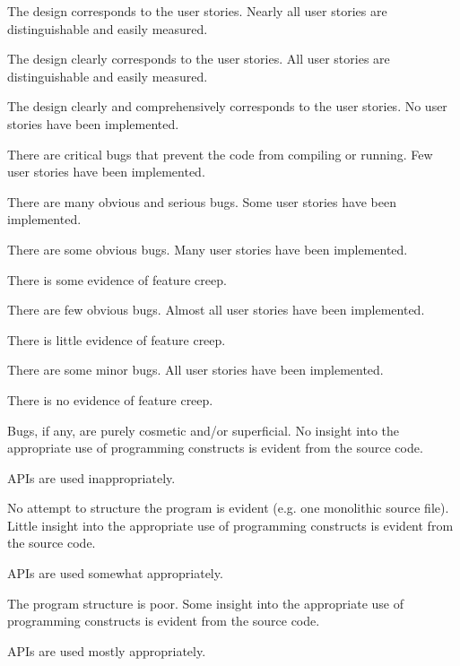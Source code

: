 \documentclass{../fal_assignment}
\begin{document}
\begin{markingrubric}
            \par The design corresponds to the user stories.
        \grade Nearly all user stories are distinguishable and easily measured.
            \par The design clearly corresponds to the user stories.
        \grade All user stories are distinguishable and easily measured.
            \par The design clearly and comprehensively corresponds to the user stories.
%
        \grade\fail No user stories have been implemented.
            \par There are critical bugs that prevent the code from compiling or running.
        \grade Few user stories have been implemented.
            \par There are many obvious and serious bugs.
        \grade Some user stories have been implemented.
            \par There are some obvious bugs.
        \grade Many user stories have been implemented.
            \par There is some evidence of feature creep.
            \par There are few obvious bugs.
        \grade Almost all user stories have been implemented.
            \par There is little evidence of feature creep.
            \par There are some minor bugs.
        \grade All user stories have been implemented.
            \par There is no evidence of feature creep.
            \par Bugs, if any, are purely cosmetic and/or superficial.
%
        \grade\fail No insight into the appropriate use of programming constructs is evident from the source code.
            \par APIs are used inappropriately.
            \par No attempt to structure the program is evident (e.g. one monolithic source file).
        \grade Little insight into the appropriate use of programming constructs is evident from the source code.
            \par APIs are used somewhat appropriately.
            \par The program structure is poor.
        \grade Some insight into the appropriate use of programming constructs is evident from the source code.
            \par APIs are used mostly appropriately.

\end{markingrubric}
\end{document}
